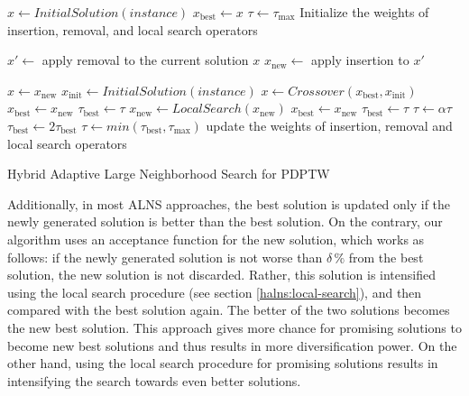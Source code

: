         \begin{algorithm}[!ht]
    $ x \leftarrow InitialSolution(instance) $ 
    $ x_{\mathrm{best}} \leftarrow x $ 
    $ \tau \leftarrow \tau_{\mathrm{max}} $ 
    Initialize the weights of insertion, removal, and local search operators\;
     {
        $x' \leftarrow$ apply removal to the current solution $ x $\;
        $x_{\mathrm{new}} \leftarrow$ apply insertion to $ x' $ 
        
         {
             {
                $x \leftarrow x_{\mathrm{new}}$\;
            }
             {
                $ x_{\mathrm{init}} \leftarrow InitialSolution(instance) $\;
                $ x \leftarrow Crossover(x_{\mathrm{best}}, x_{\mathrm{init}}) $\;
            }
             {
                $x_{\mathrm{best}} \leftarrow x_{\mathrm{new}}$\;
                $\tau_{\mathrm{best}} \leftarrow \tau$\;
            }
             {
                $x_{\mathrm{new}} \leftarrow LocalSearch(x_{\mathrm{new}})$\;
                 {
                    $x_{\mathrm{best}} \leftarrow x_{\mathrm{new}}$\;
                    $\tau_{\mathrm{best}} \leftarrow \tau$\;
                }
            }
        }
        $\tau \leftarrow \alpha \tau$\;
         {
            $\tau_{\mathrm{best}} \leftarrow 2\tau_{\mathrm{best}}$\;
            $\tau \leftarrow min(\tau_{\mathrm{best}}, \tau_{\mathrm{max}})$\;
        }
        update the weights of insertion, removal and local search operators\;
    }
    \caption{\label{alg:halns-loop} Hybrid Adaptive Large Neighborhood Search for PDPTW}
    \end{algorithm}
    
    
    
    Additionally, in most ALNS approaches, the best solution is updated only if the newly generated solution is better than the best solution. On the contrary, our algorithm uses an acceptance function for the new solution, which works as follows: if the newly generated solution is not worse than $\delta\,\%$ from the best solution, the new solution is not discarded. Rather, this solution is intensified using the local search procedure (see section \ref{halns:local-search}), and then compared with the best solution again. The better of the two solutions becomes the new best solution. This approach gives more chance for promising solutions to become new best solutions and thus results in more diversification power. On the other hand, using the local search procedure for promising solutions results in intensifying the search towards even better solutions.
    
